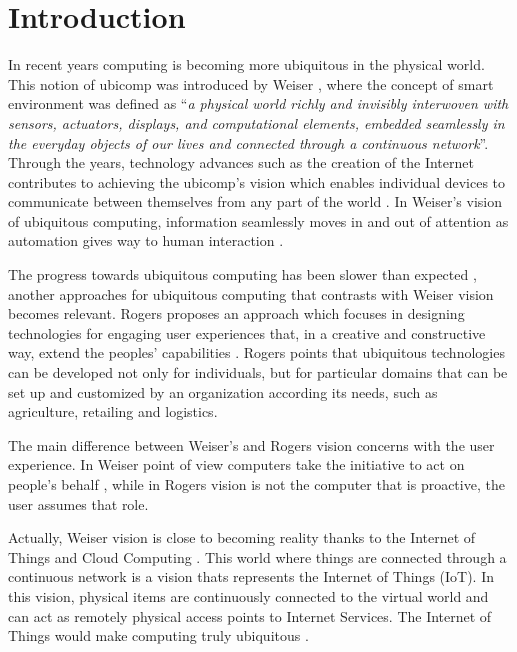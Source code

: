 \section{Introduction}
\label{sec:introduction}
In recent years computing is becoming more ubiquitous in the physical world. This
notion of ubicomp was introduced by Weiser \cite{weiser1999origins}, where the concept of
smart environment was defined as ``\textit{a physical world richly and invisibly
interwoven with sensors, actuators, displays, and computational elements, embedded
seamlessly in the everyday objects of our lives and connected through a continuous network}''.
Through the years, technology advances such as the creation of the Internet contributes
to achieving the ubicomp's vision which enables individual devices to communicate between
themselves from any part of the world \cite{gubbi2013internet}. In Weiser's vision of
ubiquitous computing, information seamlessly moves in and out of attention as automation
gives way to human interaction \cite{weiser1991computer}.

The progress towards ubiquitous computing has been slower than expected \cite{greenfield2010everyware},
another approaches for ubiquitous computing that contrasts with Weiser vision becomes relevant.
Rogers proposes an approach which focuses in designing technologies for engaging user
experiences that, in a creative and constructive way, extend the peoples' capabilities \cite{rogers2006moving}.
Rogers points that ubiquitous technologies can be developed not only for individuals,
but for particular domains that can be set up and customized by an organization according
its needs, such as agriculture, retailing and logistics.

The main difference between Weiser's and Rogers vision concerns with the user experience.
In Weiser point of view computers take the initiative to act on people's behalf \cite{tennenhouse2000proactive},
while in Rogers vision is not the computer that is proactive, the user assumes that role.

Actually, Weiser vision is close to becoming reality thanks to the Internet of Things
and Cloud Computing \cite{caceres2012ubicomp}. This world where things are connected
through a continuous network is a vision thats represents the Internet of Things (IoT).
In this vision, physical items are continuously connected to the virtual world and can
act as remotely physical access points to Internet Services. The Internet of Things would
make computing truly ubiquitous \cite{mattern2010internet}.

